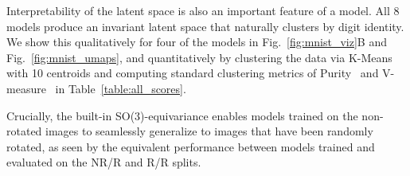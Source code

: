 Interpretability of the latent space is also an important feature of a model.  All 8 models produce
an invariant latent space that naturally clusters by digit identity. We show this qualitatively for
four of the models in Fig.~\ref{fig:mnist_viz}B and
Fig.~\ref{fig:mnist_umaps}, and quantitatively by clustering the data via K-Means with 10
centroids and computing standard clustering metrics of Purity~\cite{aldenderfer_cluster_1984} and
V-measure~\cite{rosenberg_v-measure_2007} in Table~\ref{table:all_scores}.

Crucially, the built-in SO(3)-equivariance enables models trained on the non-rotated images to
seamlessly generalize to images that have been randomly rotated, as seen by the equivalent
performance between models trained and evaluated on the NR/R and R/R splits.



